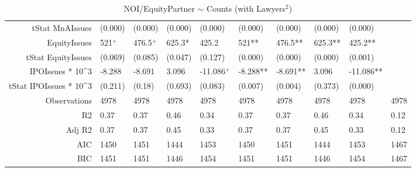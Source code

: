 \begin{table}[ht]
\begin{tabular}{rlllllllll}
  tStat MnAIssues & (0.000) & (0.000) & (0.000) & (0.000) & (0.000) & (0.000) & (0.000) & (0.000) &  \\ 
  EquityIssues & 521$^{+}$ & 476.5$^{+}$ & 625.3* & 425.2 & 521** & 476.5** & 625.3** & 425.2** &  \\ 
  tStat EquityIssues & (0.069) & (0.085) & (0.047) & (0.127) & (0.000) & (0.000) & (0.000) & (0.001) &  \\ 
  IPOIssues * 10^3 & -8.288 & -8.691 & 3.096 & -11.086$^{+}$ & -8.288** & -8.691** & 3.096 & -11.086** &  \\ 
  tStat IPOIssues * 10^3 & (0.211) & (0.18) & (0.693) & (0.083) & (0.007) & (0.004) & (0.373) & (0.000) &  \\ 
  Observations & 4978 & 4978 & 4978 & 4978 & 4978 & 4978 & 4978 & 4978 & 4978 \\ 
  R2 & 0.37 & 0.37 & 0.46 & 0.34 & 0.37 & 0.37 & 0.46 & 0.34 & 0.12 \\ 
  Adj R2 & 0.37 & 0.37 & 0.45 & 0.33 & 0.37 & 0.37 & 0.45 & 0.33 & 0.12 \\ 
  AIC & 1450 & 1451 & 1444 & 1453 & 1450 & 1451 & 1444 & 1453 & 1467 \\ 
  BIC & 1451 & 1451 & 1446 & 1454 & 1451 & 1451 & 1446 & 1454 & 1467 \\ 
   \hline
\end{tabular}
\caption{NOI/EquityPartner $\sim$ Counts (with Lawyers$^2$)} 
\end{table}
